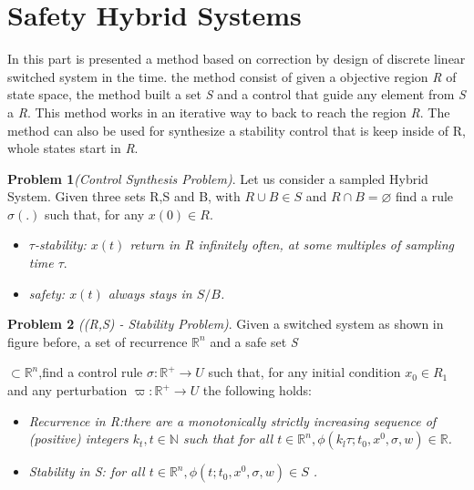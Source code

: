 \documentclass[conference]{IEEEtran}
\begin{document}
\section{Safety Hybrid Systems}


In this part is presented a method based on correction by design of
 discrete linear switched system in the time. the method consist of 
 given a objective region \emph{R} of state space, the method built 
 a set \emph{S} and a control that guide any element from  \emph{S} 
 a \emph{R}. This method works in an iterative way to back to reach 
 the region \emph{R}. The method  can also be used for synthesize 
 a stability control that is keep inside of R, whole states start in
  \emph{R}.


  \textbf{Problem 1}\emph{(Control Synthesis Problem)}. Let us 
consider a sampled Hybrid System. Given three sets R,S and B, 
with ${R \cup B \in S}$  and ${R \cap B = \varnothing }$ find a 
rule ${\sigma(.)}$ such that, for any ${x(0) \in R }$. 

\begin{itemize}
    \item \emph{ ${\tau}$-stability: ${x(t)}$ return in R 
    infinitely often, at some multiples of sampling time ${\tau}$}.
    \item \emph{ safety: ${x(t)}$ always stays in ${S/B}$.}
\end{itemize}




 \textbf{Problem 2} \emph{((R,S) - Stability Problem)}. Given a 
 switched system as shown in figure before, a set of recurrence 
 ${\mathbb{R}^n}$ and a safe set \emph{S}
 
 ${\subset \mathbb{R}^n}$,find a control rule 
 ${\sigma : \mathbb{R}^+ \rightarrow U}$ such that, for any
  initial condition ${x_0  \in  R_1}$ and any perturbation 
  ${\varpi :\mathbb{R}^+\rightarrow U}$  the
   following holds:
 
 \begin{itemize}
    \item \emph{ Recurrence in \emph{R}:there are a monotonically 
    strictly increasing sequence of (positive) integers
    ${k_t, t \in \mathbb{N}}$ such that for all ${ t \in \mathbb{R}^n,
    \phi(k_l\tau;t_0,x^0,\sigma,w) \in \mathbb{R} }$.}

    \item \emph{ Stability in \emph{S}: for all ${ t \in \mathbb{R}^n,
    \phi(t;t_0,x^0,\sigma,w) \in S}$ .}
\end{itemize}
\end{document}
